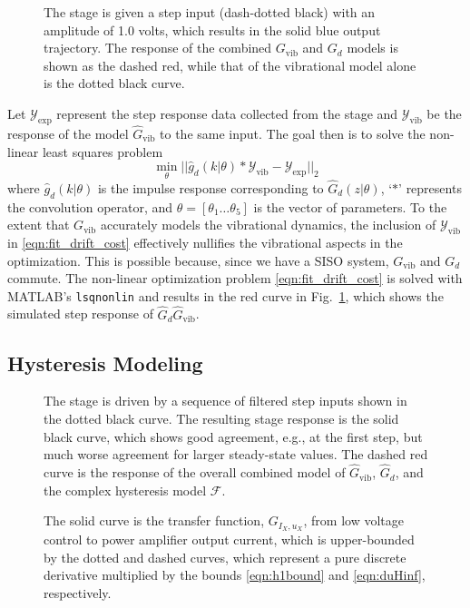\documentclass[twocolumn,twoside]{IEEEtran}
\newcommand{\Gv}{\ensuremath{G_{\text{vib}}}\xspace}
\newcommand{\hGv}{\ensuremath{\hat{G}_{\text{vib}}}\xspace}
\begin{document}
\begin{figure}
  
  \caption{The stage is given a step input (dash-dotted black) with an amplitude of 1.0 volts, which results in the solid blue output trajectory. The response of the combined $\Gv$ and $G_{d}$ models is shown as the dashed red, while that of the vibrational model alone is the dotted black curve.}
  \label{fig:drift_fit}
\end{figure}
Let $\mathcal{Y}_{\text{exp}}$ represent the step response data collected from the stage and  $\mathcal{Y}_{\text{vib}}$ be the response of the model $\hat{G}_{\textrm{vib}}$ to the same input. The goal then is to solve the non-linear least squares problem
\begin{equation}
  \min_{\theta}\bigl|\bigl| \hat{g}_d(k|\theta)*\mathcal{Y}_{\text{vib}} - \mathcal{Y}_{\text{exp}}\bigr|\bigr|_2
  \label{eqn:fit_drift_cost}
\end{equation}
where $\hat{g}_d(k|\theta)$ is the impulse response corresponding to $\hat{G}_d(z|\theta)$, `$*$' represents the convolution operator, and  ${\theta=[\theta_1\dots\theta_5]}$ is the vector of parameters. To the extent that $\Gv$ accurately models the vibrational dynamics, the inclusion of $\mathcal{Y}_{\text{vib}}$ in \eqref{eqn:fit_drift_cost} effectively nullifies the vibrational aspects in the optimization. This is possible because, since we have a SISO system, $\Gv$ and $G_d$ commute. 
The non-linear optimization problem \eqref{eqn:fit_drift_cost} is solved with MATLAB's \texttt{lsqnonlin} and results in the red curve in Fig.~\ref{fig:drift_fit}, which shows the simulated step response of $\hat{G}_d\hGv$. 

\subsection{Hysteresis Modeling}\label{sec:hyst_model}
\begin{figure*}[h!]
  \begin{minipage}{0.48\textwidth}
  
  \caption{The stage is driven by a sequence of filtered step inputs shown in the dotted black curve. The resulting stage response is the solid black curve, which shows good agreement, e.g., at the first step, but much worse agreement for larger steady-state values. The dashed red curve is the response of the overall combined model of $\hGv$, $\hat{G}_{d}$, and the complex hysteresis model $\mathcal{F}$.}
  \label{fig:hyst_resp_dem}
\end{minipage}
\hfill
\begin{minipage}{0.48\textwidth}
\centering

\caption{ The solid curve is the transfer function, $G_{I_X, u_X}$, from low voltage control to power amplifier output current, which is upper-bounded by the dotted and dashed curves, which represent a pure discrete derivative multiplied by the bounds \eqref{eqn:h1bound} and \eqref{eqn:duHinf}, respectively.}
\label{fig:powTF}
\end{minipage}
\end{figure*}
\end{document}
